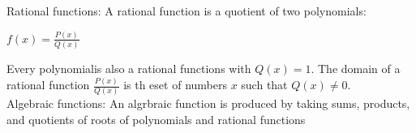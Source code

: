 \documentclass{article}
\begin{document}
Rational functions: A rational function is a quotient of two polynomials:\\
\begin{center}$f(x) = \frac{P(x)}{Q(x)}$\end{center}
Every polynomialis also a rational functions with $Q(x) = 1$. The domain of a rational function $\frac{P(x)}{Q(x)}$ is th eset of numbers $x$ such that $Q(x) \neq 0$.\\

Algebraic functions: An algrbraic function is produced by taking sums, products, and quotients of roots of polynomials and rational functions
\end{document}
